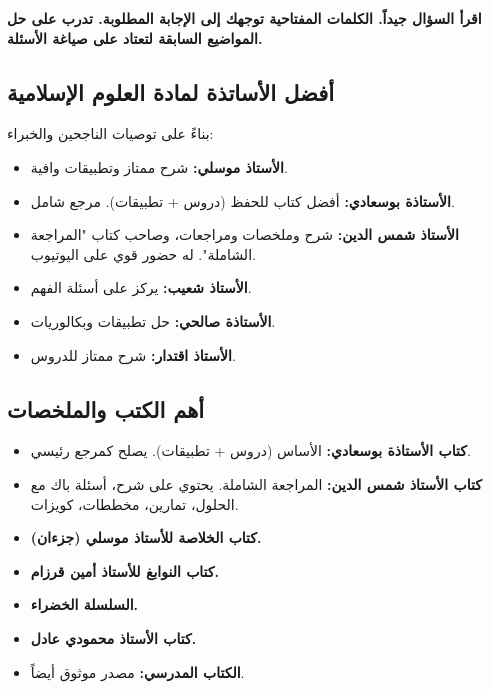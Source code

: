 \documentclass[12pt,a4paper]{book}
\newcommand{\importantAr}[1]{%
	\begin{important}
		\bfseries #1
	\end{important}
}
\begin{document}
	\importantAr{اقرأ السؤال جيداً. الكلمات المفتاحية توجهك إلى الإجابة المطلوبة. تدرب على حل المواضيع السابقة لتعتاد على صياغة الأسئلة.}
	
	\subsection{أفضل الأساتذة لمادة العلوم الإسلامية}
	
	بناءً على توصيات الناجحين والخبراء:
	
	\begin{itemize}
		\item \textbf{الأستاذ موسلي:} شرح ممتاز وتطبيقات وافية.  
		\item \textbf{الأستاذة بوسعادي:} أفضل كتاب للحفظ (دروس + تطبيقات). مرجع شامل.
		\item \textbf{الأستاذ شمس الدين:} شرح وملخصات ومراجعات، \newline وصاحب كتاب "المراجعة الشاملة". له حضور قوي على اليوتيوب.
		\item \textbf{الأستاذ شعيب:} يركز على أسئلة الفهم.
		\item \textbf{الأستاذة صالحي:} حل تطبيقات وبكالوريات.
		\item \textbf{الأستاذ اقتدار:} شرح ممتاز للدروس.
	\end{itemize}
	
	\subsection{أهم الكتب والملخصات}
	
	\begin{itemize}
		\item \textbf{كتاب الأستاذة بوسعادي:} الأساس (دروس + تطبيقات). يصلح كمرجع رئيسي.
		\item \textbf{كتاب الأستاذ شمس الدين:} المراجعة الشاملة. يحتوي على شرح، أسئلة باك مع الحلول، تمارين، مخططات، كويزات.
		\item \textbf{كتاب الخلاصة للأستاذ موسلي (جزءان).}
		\item \textbf{كتاب النوابغ للأستاذ أمين قرزام.}
		\item \textbf{السلسلة الخضراء.}
		\item \textbf{كتاب الأستاذ محمودي عادل.}
		\item \textbf{الكتاب المدرسي:} مصدر موثوق أيضاً.
	\end{itemize}
	
\end{document}

